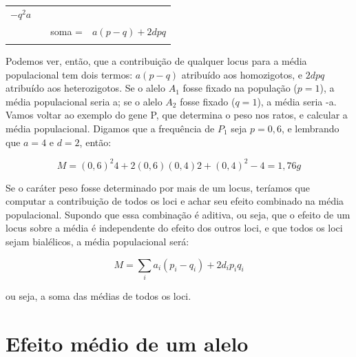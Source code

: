 \documentclass[portuges,]{tufte-handout}
\begin{document}
\begin{longtable}[c]{@{}cccr@{}}
\begin{minipage}[t]{0.18\columnwidth}
\(-q^2a\)
\end{minipage}
\\\addlinespace
\begin{minipage}[t]{0.15\columnwidth}\centering
\end{minipage} & \begin{minipage}[t]{0.22\columnwidth}\centering
\end{minipage} & \begin{minipage}[t]{0.12\columnwidth}\centering
soma =
\end{minipage} & \begin{minipage}[t]{0.18\columnwidth}\raggedleft
\(a(p-q)+2dpq\)
\end{minipage}
\\\addlinespace
\bottomrule
\end{longtable}

\newpage

Podemos ver, então, que a contribuição de qualquer locus para a média
populacional tem dois termos: \(a(p-q)\) atribuído aos homozigotos, e
\(2dpq\) atribuído aos heterozigotos. Se o alelo \(A_1\) fosse fixado na
população (\(p = 1\)), a média populacional seria a; se o alelo \(A_2\)
fosse fixado (\(q = 1\)), a média seria -a. Vamos voltar ao exemplo do
gene P, que determina o peso nos ratos, e calcular a média populacional.
Digamos que a frequência de \(P_1\) seja \(p = 0,6\), e lembrando que
\(a = 4\) e \(d = 2\), então:

\[
M = (0,6)^2 4 + 2(0,6)(0,4) 2 + (0,4)^2 -4 = 1,76g
\]

Se o caráter peso fosse determinado por mais de um locus, teríamos que
computar a contribuição de todos os loci e achar seu efeito combinado na
média populacional. Supondo que essa combinação é aditiva, ou seja, que
o efeito de um locus sobre a média é independente do efeito dos outros
loci, e que todos os loci sejam bialélicos, a média populacional será:

\[
M = \sum_{i}a_i(p_i-q_i) + 2d_ip_iq_i
\]

ou seja, a soma das médias de todos os loci.

\section{Efeito médio de um alelo}\label{efeito-muxe9dio-de-um-alelo}
\end{document}
